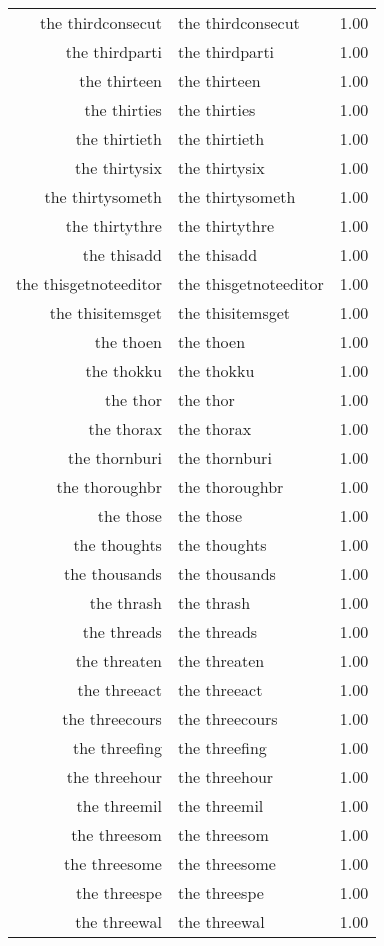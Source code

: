 \begin{table}[ht]
\begin{tabular}{rlr}
  the thirdconsecut & the thirdconsecut & 1.00 \\ 
  the thirdparti & the thirdparti & 1.00 \\ 
  the thirteen & the thirteen & 1.00 \\ 
  the thirties & the thirties & 1.00 \\ 
  the thirtieth & the thirtieth & 1.00 \\ 
  the thirtysix & the thirtysix & 1.00 \\ 
  the thirtysometh & the thirtysometh & 1.00 \\ 
  the thirtythre & the thirtythre & 1.00 \\ 
  the thisadd & the thisadd & 1.00 \\ 
  the thisgetnoteeditor & the thisgetnoteeditor & 1.00 \\ 
  the thisitemsget & the thisitemsget & 1.00 \\ 
  the thoen & the thoen & 1.00 \\ 
  the thokku & the thokku & 1.00 \\ 
  the thor & the thor & 1.00 \\ 
  the thorax & the thorax & 1.00 \\ 
  the thornburi & the thornburi & 1.00 \\ 
  the thoroughbr & the thoroughbr & 1.00 \\ 
  the those & the those & 1.00 \\ 
  the thoughts & the thoughts & 1.00 \\ 
  the thousands & the thousands & 1.00 \\ 
  the thrash & the thrash & 1.00 \\ 
  the threads & the threads & 1.00 \\ 
  the threaten & the threaten & 1.00 \\ 
  the threeact & the threeact & 1.00 \\ 
  the threecours & the threecours & 1.00 \\ 
  the threefing & the threefing & 1.00 \\ 
  the threehour & the threehour & 1.00 \\ 
  the threemil & the threemil & 1.00 \\ 
  the threesom & the threesom & 1.00 \\ 
  the threesome & the threesome & 1.00 \\ 
  the threespe & the threespe & 1.00 \\ 
  the threewal & the threewal & 1.00 \\ 

\end{tabular}
\end{table}
